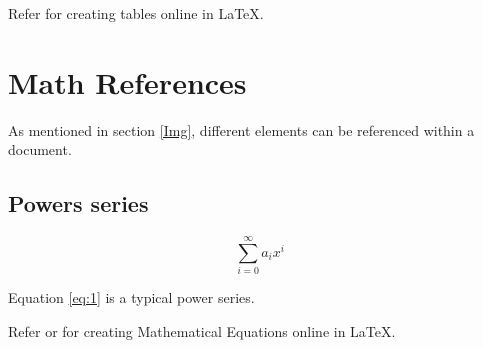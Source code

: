 Refer \cite{tablegen} for creating tables online in LaTeX.  

\section{Math References} \label{mathrefs}
As mentioned in section \ref{Img}, different elements can be referenced within a document.

\subsection{Powers series} \label{subsection}

\begin{equation} \label{eq:1}
\sum_{i=0}^{\infty} a_i x^i
\end{equation}

Equation \ref{eq:1} is a typical power series.

Refer \cite{Equationgen1} or \cite{Equationgen2} for creating Mathematical Equations online in LaTeX.

\newpage